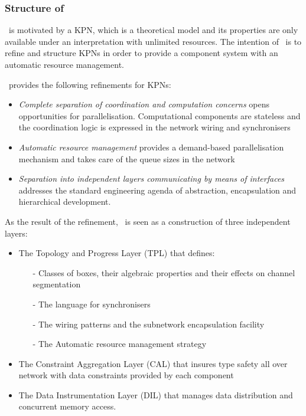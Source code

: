     \subsubsection{Structure of \ak\ }
\ak\ is motivated by a KPN, which is a theoretical model and its properties are only available under an interpretation with unlimited resources. The intention of \ak\ is to refine and structure KPNs in order to provide a component system with an automatic resource management.

\ak\ provides the following refinements for KPNs:
\begin{itemize}
\item \emph{Complete separation of coordination and computation concerns} opens opportunities for parallelisation. Computational components are stateless and the coordination logic is expressed in the network wiring and synchronisers

\item \emph{Automatic resource management} provides a demand-based parallelisation mechanism and takes care of the queue sizes in the network

\item \emph{Separation into independent layers communicating by means of interfaces} addresses the standard engineering agenda of abstraction, encapsulation and hierarchical development.
\end{itemize}

As the result of the refinement, \ak\ is seen as a construction of three independent layers:
\begin{itemize}
\item The Topology and Progress Layer (TPL) that defines:
    \begin{itemize}
\item[-] Classes of boxes, their algebraic properties and their effects on channel segmentation
\item[-] The language for synchronisers
\item[-] The wiring patterns and the subnetwork encapsulation facility
\item[-] The Automatic resource management strategy
    \end{itemize}

\item The Constraint Aggregation Layer (CAL) that insures type safety all over network with data constraints provided by each component

\item The Data Instrumentation Layer (DIL) that manages data distribution and concurrent memory access.
\end{itemize}


